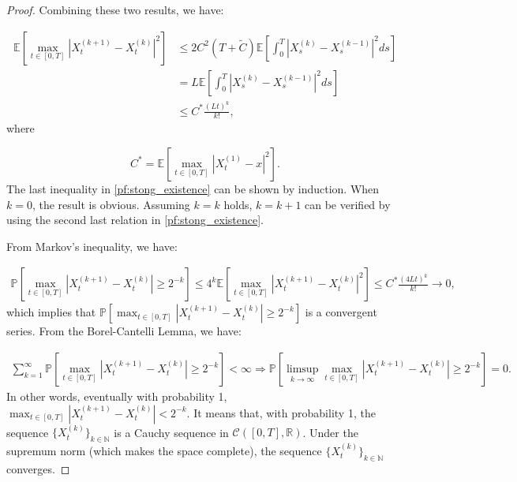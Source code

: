 \documentclass{article}
\begin{document}
\begin{proof}
Combining these two results, we have:

\begin{equation} \label{pf:stong_existence}
\begin{aligned}
\mathbb{E}\left[\max_{t\in[0,T]}|X^{(k+1)}_t-X^{(k)}_t|^2\right]&\leq 2C^2(T+\tilde{C})\mathbb{E}\left[\int_0^T|X_s^{(k)}-X_s^{(k-1)}|^2ds\right]\\
&=L\mathbb{E}\left[\int_0^T|X_s^{(k)}-X_s^{(k-1)}|^2ds\right]\\
&\leq C^*\frac{(Lt)^k}{k!},
\end{aligned}
\end{equation}
where

\begin{equation*}
C^*=\mathbb{E}\left[\max_{t\in[0,T]}|X^{(1)}_t-x|^2\right].
\end{equation*}
The last inequality in \eqref{pf:stong_existence} can be shown by induction. When $k=0$, the result is obvious. Assuming $k=k$ holds, $k=k+1$ can be verified by using the second last relation in \eqref{pf:stong_existence}.

From Markov's inequality, we have:

\begin{equation*}
\begin{aligned}
\mathbb{P}\left[\max_{t\in[0,T]}|X^{(k+1)}_t-X^{(k)}_t|\geq2^{-k}\right]\leq4^k\mathbb{E}\left[\max_{t\in[0,T]}|X^{(k+1)}_t-X^{(k)}_t|^2\right]\leq C^*\frac{(4Lt)^k}{k!}\rightarrow0,
\end{aligned}
\end{equation*}
which implies that $\mathbb{P}\left[\max_{t\in[0,T]}|X^{(k+1)}_t-X^{(k)}_t|\geq2^{-k}\right]$ is a convergent series. From the Borel-Cantelli Lemma, we have:

\begin{equation*}
\begin{aligned}
\sum_{k=1}^\infty\mathbb{P}\left[\max_{t\in[0,T]}|X^{(k+1)}_t-X^{(k)}_t|\geq2^{-k}\right]<\infty \Rightarrow \mathbb{P}\left[\limsup_{k\rightarrow\infty}\max_{t\in[0,T]}|X^{(k+1)}_t-X^{(k)}_t|\geq2^{-k}\right]=0.
\end{aligned}
\end{equation*}
In other words, eventually with probability 1, $\max_{t\in[0,T]}|X^{(k+1)}_t-X^{(k)}_t|<2^{-k}$. It means that, with probability 1, the sequence $\{X_t^{(k)}\}_{k\in\mathbb{N}}$ is a Cauchy sequence in $\mathcal{C}([0,T],\mathbb{R})$. Under the supremum norm (which makes the space complete), the sequence $\{X_t^{(k)}\}_{k\in\mathbb{N}}$ converges.


\end{proof}
\end{document}
